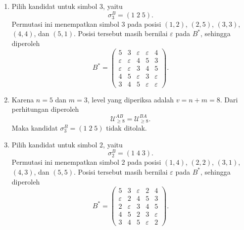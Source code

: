 \begin{contoh}
\begin{enumerate}
    \item Pilih kandidat untuk simbol $3$, yaitu
          \[
            \sigma_3^B=(1\;2\;5).
          \]
          Permutasi ini menempatkan simbol $3$ pada posisi
          $(1,2)$, $(2,5)$, $(3,3)$, $(4,4)$, dan $(5,1)$.
          Posisi tersebut masih bernilai $\varepsilon$ pada $B^*$, sehingga
          diperoleh
          \[
            B^*=
            \begin{pmatrix}
              5           & 3           & \varepsilon & \varepsilon & 4           \\
              \varepsilon & \varepsilon & 4           & 5           & 3           \\
              \varepsilon & \varepsilon & 3           & 4           & 5           \\
              4           & 5           & \varepsilon & 3           & \varepsilon \\
              3           & 4           & 5           & \varepsilon & \varepsilon
            \end{pmatrix}.
          \]

    \item Karena $n=5$ dan $m=3$, level yang diperiksa adalah $v=n+m=8$.
          Dari perhitungan diperoleh
          \[
            \mathcal{U}_{\ge 8}^{AB}
            =
            \mathcal{U}_{\ge 8}^{BA}.
          \]
          Maka kandidat $\sigma_3^B=(1\;2\;5)$ tidak ditolak.

    \item Pilih kandidat untuk simbol $2$, yaitu
          \[
            \sigma_2^B=(1\;4\;3).
          \]
          Permutasi ini menempatkan simbol $2$ pada posisi
          $(1,4)$, $(2,2)$, $(3,1)$, $(4,3)$, dan $(5,5)$.
          Posisi tersebut masih bernilai $\varepsilon$ pada $B^*$, sehingga
          diperoleh
          \[
            B^*=
            \begin{pmatrix}
              5           & 3           & \varepsilon & 2           & 4           \\
              \varepsilon & 2           & 4           & 5           & 3           \\
              2           & \varepsilon & 3           & 4           & 5           \\
              4           & 5           & 2           & 3           & \varepsilon \\
              3           & 4           & 5           & \varepsilon & 2
            \end{pmatrix}.
          \]


\end{enumerate}
\end{contoh}
